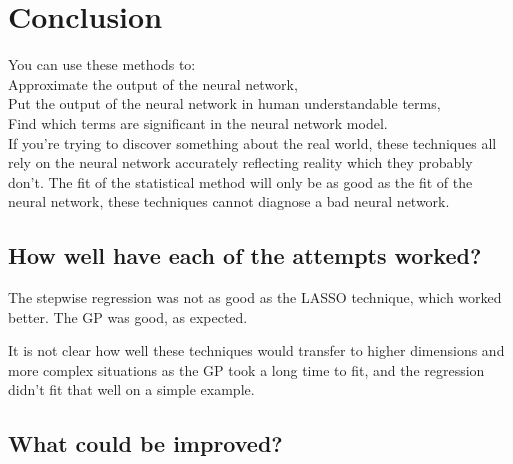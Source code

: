 
\chapter{Conclusion}

You can use these methods to:\\
Approximate the output of the neural network,\\
Put the output of the neural network in human understandable terms,\\
Find which terms are significant in the neural network model.\\

If you're trying to discover something about the real world, these techniques all rely on the neural network accurately reflecting reality which they probably don't.
The fit of the statistical method will only be as good as the fit of the neural network, these techniques cannot diagnose a bad neural network.


\section{How well have each of the attempts worked?}

The stepwise regression was not as good as the \ac{LASSO} technique, which worked better.
The \ac{GP} was good, as expected.

It is not clear how well these techniques would transfer to higher dimensions and more complex situations as the \ac{GP} took a long time to fit, and the regression didn't fit that well on a simple example.

\section{What could be improved?}

